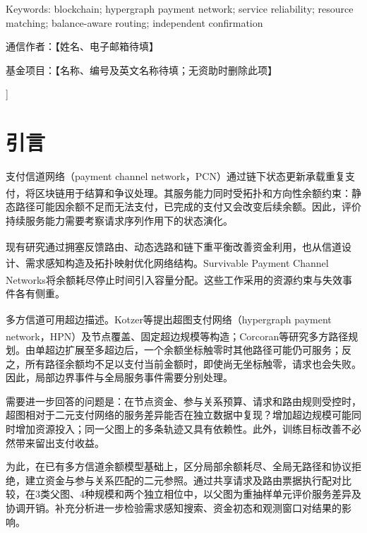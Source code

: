 \documentclass[UTF8,a4paper,twocolumn,fontset=none,zihao=5]{ctexart}
\newcommand{\upcite}[1]{\textsuperscript{\cite{#1}}}
\begin{document}
{\begin{minipage}{\textwidth}
{\small\noindent Keywords: blockchain; hypergraph payment network; service reliability; resource matching; balance-aware routing; independent confirmation\par}\vspace{3pt}

{\small\noindent 通信作者：【姓名、电子邮箱待填】\par}\vspace{3pt}

{\small\noindent 基金项目：【名称、编号及英文名称待填；无资助时删除此项】\par}\vspace{3pt}

\vspace{7pt}\end{minipage}}]

\section{引言}

支付信道网络（payment channel network，PCN）通过链下状态更新承载重复支付，将区块链用于结算和争议处理\upcite{r1,r2}。其服务能力同时受拓扑和方向性余额约束：静态路径可能因余额不足而无法支付，已完成的支付又会改变后续余额。因此，评价持续服务能力需要考察请求序列作用下的状态演化。


现有研究通过拥塞反馈路由\upcite{r3}、动态选路\upcite{r4}和链下重平衡\upcite{r5}改善资金利用，也从信道设计\upcite{r6}、需求感知构造\upcite{r7}及拓扑映射\upcite{r8}优化网络结构。Survivable Payment Channel Networks将余额耗尽停止时间引入容量分配\upcite{r9}。这些工作采用的资源约束与失效事件各有侧重。


多方信道可用超边描述。Kotzer等\upcite{r10}提出超图支付网络（hypergraph payment network，HPN）及节点覆盖、固定超边规模等构造；Corcoran等\upcite{r11}研究多方路径规划。由单超边扩展至多超边后，一个余额坐标触零时其他路径可能仍可服务；反之，所有路径余额均不足以支付当前金额时，即使尚无坐标触零，请求也会失败。因此，局部边界事件与全局服务事件需要分别处理。


需要进一步回答的问题是：在节点资金、参与关系预算、请求和路由规则受控时，超图相对于二元支付网络的服务差异能否在独立数据中复现？增加超边规模可能同时增加资源投入；同一父图上的多条轨迹又具有依赖性。此外，训练目标改善不必然带来留出支付收益。


为此，在已有多方信道余额模型基础上，区分局部余额耗尽、全局无路径和协议拒绝，建立资金与参与关系匹配的二元参照。通过共享请求及路由票据执行配对比较，在3类父图、4种规模和两个独立相位中，以父图为重抽样单元评价服务差异及协调开销。补充分析进一步检验需求感知搜索、资金初态和观测窗口对结果的影响。
\end{document}
